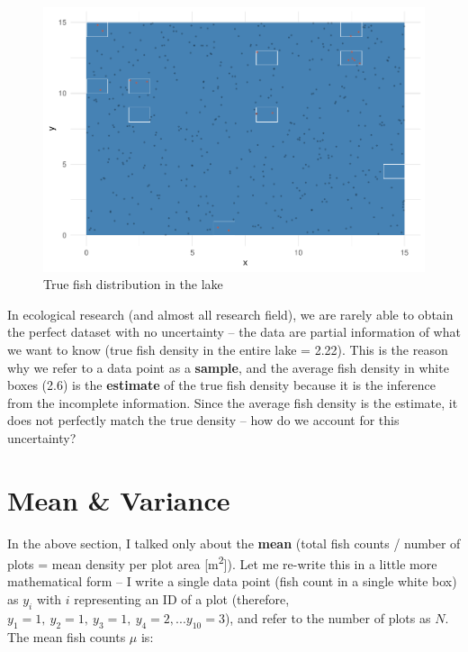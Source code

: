\documentclass[
]{book}
\begin{document}
\begin{figure}

{\centering \includegraphics{_main_files/figure-latex/fish-plot-2-1} 

}

\caption{True fish distribution in the lake}\label{fig:fish-plot-2}
\end{figure}

In ecological research (and almost all research field), we are rarely able to obtain the perfect dataset with no uncertainty -- the data are partial information of what we want to know (true fish density in the entire lake = 2.22). This is the reason why we refer to a data point as a \textbf{sample}, and the average fish density in white boxes (2.6) is the \textbf{estimate} of the true fish density because it is the inference from the incomplete information. Since the average fish density is the estimate, it does not perfectly match the true density -- how do we account for this uncertainty?

\hypertarget{mean-variance}{%
\section{Mean \& Variance}\label{mean-variance}}

In the above section, I talked only about the \textbf{mean} (total fish counts / number of plots = mean density per plot area {[}m\textsuperscript{2}{]}). Let me re-write this in a little more mathematical form -- I write a single data point (fish count in a single white box) as \(y_i\) with \(i\) representing an ID of a plot (therefore, \(y_1 = 1,~y_2 = 1,~y_3 = 1,~y_4 = 2, ...y_{10}=3\)), and refer to the number of plots as \(N\). The mean fish counts \(\mu\) is:
\end{document}
